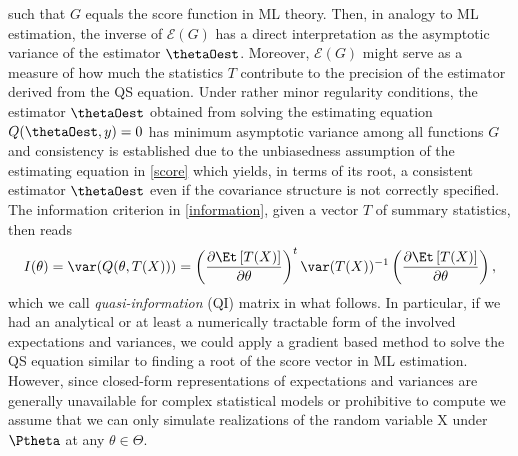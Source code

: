 such that $G$ equals the score function in ML theory. Then, in analogy to ML
estimation, the inverse of $\mathcal{E}(G)$ has a direct interpretation as the asymptotic variance of
the estimator $\thetaOest$. Moreover, $\mathcal{E}(G)$ might serve
as a measure of how much the statistics $T$ contribute to the precision of the
estimator derived from the QS equation. Under rather minor regularity conditions, the
estimator $\thetaOest$ obtained from solving the estimating equation $Q(\thetaOest,y)=0$ has minimum
asymptotic variance among all functions $G$ and consistency \citep[see,
e.\,g.][]{ref:Liang1995} is established due to the unbiasedness assumption of
the estimating equation in \eqref{score} which yields, in terms of its root, a
consistent estimator $\thetaOest$ even if the covariance structure is not correctly specified. The
information criterion in \eqref{information}, given a vector $T$ of summary
statistics, then reads
\begin{equation}\label{qi}
 I(\theta) = \var(Q(\theta,T(X)))= \left( \frac{\partial \Et\left[T(X)\right]}{\partial\theta} \right)^t \var(T(X))^{-1}
 \left( \frac{\partial \Et\left[T(X)\right]}{\partial\theta} \right),
\end{equation}
which we call \emph{quasi-information} (QI) matrix in what follows. In
particular, if we had an analytical or at least a numerically tractable form of the
involved expectations and variances, we could apply a gradient based method to
solve the QS equation similar to finding a root of the score vector in ML estimation. However, since closed-form
representations of expectations and variances are generally unavailable for
complex statistical models or prohibitive to compute we assume that we can only simulate realizations
of the random variable $\mathrm{X}$ under $\Ptheta$ at any $\theta\in\Theta$.\par